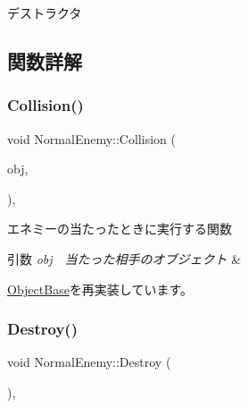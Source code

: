 デストラクタ 



\subsection{関数詳解}
\mbox{\label{class_normal_enemy_ac27e00973d2430da57e044bfe04fe5b4}} 
\subsubsection{\texorpdfstring{Collision()}{Collision()}}
{\footnotesize\ttfamily void Normal\+Enemy\+::\+Collision (\begin{DoxyParamCaption}\item[{\mbox{\hyperlink{class_object_base}{Object\+Base}} $\ast$}]{obj,  }\item[{\mbox{\hyperlink{common_8h_afb0c5e21d4133ff4f200992c0b534e1b}{V\+E\+C2}}}]{ }\end{DoxyParamCaption})\hspace{0.3cm}{\ttfamily [final]}, {\ttfamily [virtual]}}



エネミーの当たったときに実行する関数 


\begin{DoxyParams}{引数}
{\em obj　当たった相手のオブジェクト} & \\
\hline
\end{DoxyParams}


\mbox{\hyperlink{class_object_base_ad772d7a42f5e46c39481f5db22ee8193}{Object\+Base}}を再実装しています。

\mbox{\label{class_normal_enemy_a8a4271b6da6c7679d134d1c08125815b}} 
\subsubsection{\texorpdfstring{Destroy()}{Destroy()}}
{\footnotesize\ttfamily void Normal\+Enemy\+::\+Destroy (\begin{DoxyParamCaption}{ }\end{DoxyParamCaption})\hspace{0.3cm}{\ttfamily [final]}, {\ttfamily [virtual]}}



